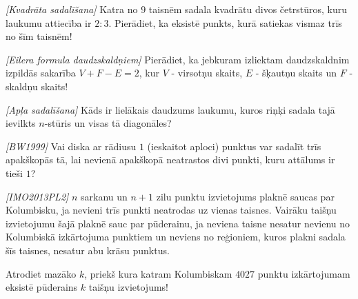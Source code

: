

%


\noindent 

\begin{problem}
\textit{[Kvadrāta sadalīšana]}
Katra no $9$ taisnēm sadala kvadrātu divos četrstūros, kuru laukumu attiecība ir $2:3$. Pierādiet, ka eksistē punkts, kurā satiekas vismaz trīs no šīm taisnēm!
\end{problem}
%

\begin{problem}
\textit{[Eilera formula daudzskaldņiem]}
Pierādiet, ka jebkuram izliektam daudzskaldnim izpildās sakarība $V+F-E=2$, kur $V$ - virsotņu skaits, $E$ - šķautņu skaits un $F$ - skaldņu skaits!
\end{problem}

\begin{problem}
\textit{[Apļa sadalīšana]}
Kāds ir lielākais daudzums laukumu, kuros riņķi sadala tajā ievilkts $n$-stūris un visas tā diagonāles?
\end{problem}


\begin{problem}
\textit{[BW1999]}
Vai diska ar rādiusu $1$ (ieskaitot aploci) punktus var sadalīt trīs apakškopās tā, lai nevienā apakškopā neatrastos divi punkti, kuru attālums ir tieši $1$?
\end{problem}

\begin{problem}
\textit{[IMO2013PL2]}
$n$ sarkanu un $n+1$ zilu punktu izvietojums plaknē saucas par Kolumbisku, ja nevieni trīs punkti neatrodas uz vienas taisnes. Vairāku taišņu izvietojumu šajā plaknē sauc par pūderainu, ja neviena taisne nesatur nevienu no Kolumbiskā izkārtojuma punktiem un neviens no reģioniem, kuros plakni sadala šīs taisnes, nesatur abu krāsu punktus. 

Atrodiet mazāko $k$, priekš kura katram Kolumbiskam $4027$ punktu izkārtojumam eksistē pūderains $k$ taišņu izvietojums!
\end{problem}

